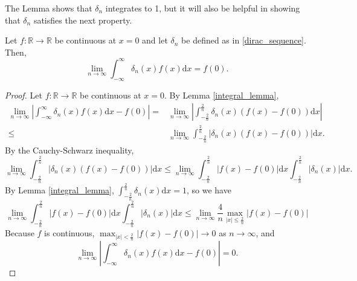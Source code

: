 \documentclass{siamart1116}
\begin{document}
The Lemma shows that $\delta_n$ integrates to 1, but it will also be helpful in showing that $\delta_n$ satisfies the next property.
\begin{theorem} \label{dirac_theorem}
Let $f:\mathbb{R}\to\mathbb{R}$ be continuous at $x=0$ and let $\delta_n$ be defined as in \eqref{dirac_sequence}. Then,
$$\lim_{n\to\infty}\int_{-\infty}^{\infty}\delta_n(x)f(x)\mathrm{d}x=f(0).$$
\end{theorem}
\begin{proof}
Let $f:\mathbb{R}\to\mathbb{R}$ be continuous at $x=0$. By Lemma \ref{integral_lemma},
\begin{align*}
\lim_{n\to\infty}\left|\int_{-\infty}^{\infty}\delta_n(x)f(x)\mathrm{d}x-f(0)\right| =& \lim_{n\to\infty}\left|\int_{-\frac{2}{n}}^{\frac{2}{n}}\delta_n(x)(f(x)-f(0))\mathrm{d}x\right|\\
\leq&  \lim_{n\to\infty}\int_{-\frac{2}{n}}^{\frac{2}{n}}\left|\delta_n(x)(f(x)-f(0))\right|\mathrm{d}x.
\end{align*}
By the Cauchy-Schwarz inequality, 
$$\lim_{n\to\infty}\int_{-\frac{2}{n}}^{\frac{2}{n}}\left|\delta_n(x)(f(x)-f(0))\right|\mathrm{d}x\leq \lim_{n\to\infty}\int_{-\frac{2}{n}}^{\frac{2}{n}}\left|f(x)-f(0)\right|\mathrm{d}x\int_{-\frac{2}{n}}^{\frac{2}{n}}\left|\delta_n(x)\right|\mathrm{d}x.$$
By Lemma \ref{integral_lemma}, $\int_{-\frac{2}{n}}^{\frac{2}{n}}\delta_n(x)\mathrm{d}x=1$, so we have
$$\lim_{n\to\infty}\int_{-\frac{2}{n}}^{\frac{2}{n}}\left|f(x)-f(0)\right|\mathrm{d}x\int_{-\frac{2}{n}}^{\frac{2}{n}}\left|\delta_n(x)\right|\mathrm{d}x \leq \lim_{n\to\infty}\frac{4}{n}\max_{|x|\leq\frac{2}{n}}|f(x)-f(0)|$$
Because $f$ is continuous, $\max_{|x|<\frac{2}{n}}|f(x)-f(0)|\to0$ as $n\to\infty$, and 
$$\lim_{n\to\infty}\left|\int_{-\infty}^{\infty}\delta_n(x)f(x)\mathrm{d}x-f(0)\right|=0.$$
\end{proof}






\end{document}

